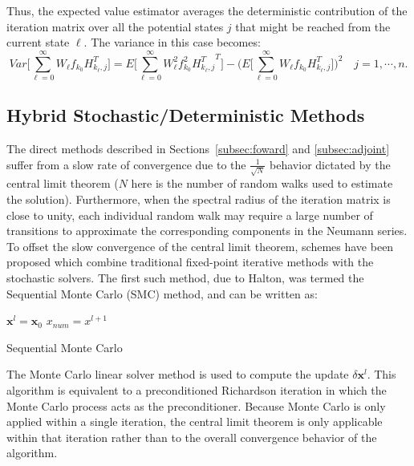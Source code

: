 Thus, the expected value estimator averages
the deterministic contribution of the iteration matrix over all the potential
states $j$ that might be reached from the current state $\ell$. The variance
in this case becomes:
\begin{equation}
Var\bigg [\sum_{\ell=0}^\infty W_{\ell}
f_{k_0}H_{k_{\ell},j}^T\bigg]=E\bigg[\sum_{\ell=0}^\infty W_{\ell}^2
f_{k_0}^2 {H_{k_{\ell},j}^T}^T\bigg ] - \bigg (E\bigg[\sum_{\ell=0}^\infty
W_{\ell}
f_{k_0}H_{k_{\ell},j}^T\bigg]\bigg )^2\quad j=1,\cdots,n
\label{adj_var}.
\end{equation}

\subsection{Hybrid Stochastic/Deterministic Methods}

The direct methods described in Sections~\ref{subsec:foward} and
\ref{subsec:adjoint} suffer from a slow rate of convergence due to the
$\frac{1}{\sqrt{N}}$ behavior dictated by the central limit theorem ($N$ here
is the number of random walks used to estimate the solution).  Furthermore,
when the spectral radius of the iteration matrix is close to unity, each
individual random walk may require a large number of transitions to
approximate the corresponding components in the Neumann series.
To offset the slow convergence of the central limit theorem, schemes have
been proposed which combine traditional fixed-point iterative methods with
the stochastic solvers.  The first such method, due to Halton, was termed
the Sequential Monte Carlo (SMC) method, and can be written as:
\begin{algorithm}[H]
 $\mathbf{x}^{l}=\mathbf{x}_0$\;
 $x_{num}=x^{l+1}$\;
 \caption{Sequential Monte Carlo}
\end{algorithm}
The Monte Carlo linear solver method is used to compute the update $\delta
\mathbf{x}^{l}$.  This algorithm is equivalent to a preconditioned Richardson
iteration in which the Monte Carlo process acts as the preconditioner.
Because Monte Carlo is only applied within a single iteration, the central
limit theorem is only applicable within that iteration rather than to
the overall convergence behavior of the algorithm.

